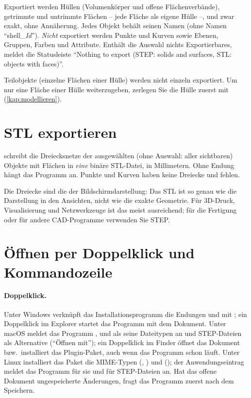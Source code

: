 Exportiert werden Hüllen (Volumenkörper und offene Flächenverbände), getrimmte und untrimmte
Flächen -- jede Fläche als eigene Hülle --, und zwar exakt, ohne Annäherung. Jedes Objekt
behält seinen Namen (ohne Namen \enquote{shell\_\textit{Id}}). \emph{Nicht} exportiert werden
Punkte und Kurven sowie Ebenen, Gruppen, Farben und Attribute. Enthält die Auswahl nichts
Exportierbares, meldet die Statusleiste \enquote{Nothing to export (STEP: solids and surfaces,
STL: objects with faces)}.

\begin{hinweis}
Teilobjekte (einzelne Flächen einer Hülle) werden nicht einzeln exportiert. Um nur eine Fläche
einer Hülle weiterzugeben, zerlegen Sie die Hülle zuerst mit 
(\autoref{kap:modellieren}).
\end{hinweis}

\section{STL exportieren}\label{sec:stl-export}

 schreibt die Dreiecksnetze der ausgewählten (ohne Auswahl: aller
sichtbaren) Objekte mit Flächen in \emph{eine} binäre STL-Datei, in Millimetern. Ohne Endung
hängt das Programm  an. Punkte und Kurven haben keine Dreiecke und fehlen.

Die Dreiecke sind die der Bildschirmdarstellung: Das STL ist so genau wie die Darstellung in
den Ansichten, nicht wie die exakte Geometrie. Für 3D-Druck, Visualisierung und
Netzwerkzeuge ist das meist ausreichend; für die Fertigung oder für andere CAD-Programme
verwenden Sie STEP.

\section{Öffnen per Doppelklick und Kommandozeile}\label{sec:kommandozeile}

\paragraph{Doppelklick.} Unter Windows verknüpft das Installationsprogramm die Endungen
 und  mit \produkt{}; ein Doppelklick im Explorer startet das
Programm mit dem Dokument. Unter macOS meldet das Programm ,  und
 als seine Dateitypen an und STEP-Dateien als Alternative (\enquote{Öffnen
mit}); ein Doppelklick im Finder öffnet das Dokument bzw.\ installiert das Plugin-Paket, auch
wenn das Programm schon läuft. Unter Linux installiert das Paket die MIME-Typen
 (, ) und
 (); der Anwendungseintrag
meldet das Programm für sie und für STEP-Dateien an. Hat das offene Dokument ungespeicherte
Änderungen, fragt das Programm zuerst nach dem Speichern.

